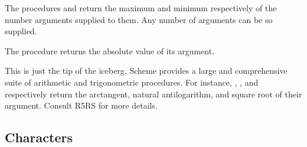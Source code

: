 

\n The procedures  and  return the maximum and
minimum respectively of the number arguments supplied to
them.  Any number of arguments can be so supplied.



\n The procedure  returns the absolute value of
its argument.



\n This is just the tip of the iceberg.  Scheme
provides a large and comprehensive suite of arithmetic
and trigonometric procedures.  For instance, ,
, and  respectively return the
arctangent, natural antilogarithm, and 
square root of their argument.  Consult
R5RS \cite{r5rs} for more details.


\subsection{Characters}

